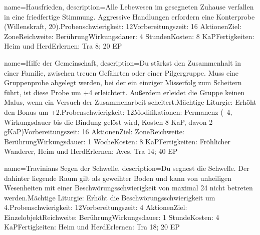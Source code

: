 {
    name={Hausfrieden},
    description={Alle Lebewesen im gesegneten Zuhause verfallen in eine friedfertige Stimmung. Aggressive Handlungen erfordern eine Konterprobe (Willenskraft, 20).\newline Probenschwierigkeit: 12\newline Vorbereitungszeit: 16 Aktionen\newline Ziel: Zone\newline Reichweite: Berührung\newline Wirkungsdauer: 4 Stunden\newline Kosten: 8 KaP\newline Fertigkeiten: Heim und Herd\newline Erlernen: Tra 8; 20 EP}
}


{
    name={Hilfe der Gemeinschaft},
    description={Du stärkst den Zusammenhalt in einer Familie, zwischen treuen Gefährten oder einer Pilgergruppe. Muss eine Gruppenprobe abgelegt werden, bei der ein einziger Misserfolg zum Scheitern führt, ist diese Probe um +4 erleichtert. Außerdem erleidet die Gruppe keinen Malus, wenn ein Versuch der Zusammenarbeit scheitert.\newline Mächtige Liturgie: Erhöht den Bonus um +2.\newline Probenschwierigkeit: 12\newline Modifikationen: Permanenz (–4, Wirkungsdauer bis die Bindung gelöst wird, Kosten 8 KaP, davon 2 gKaP)\newline Vorbereitungszeit: 16 Aktionen\newline Ziel: Zone\newline Reichweite: Berührung\newline Wirkungsdauer: 1 Woche\newline Kosten: 8 KaP\newline Fertigkeiten: Fröhlicher Wanderer, Heim und Herd\newline Erlernen: Aves, Tra 14; 40 EP}
}


{
    name={Travinians Segen der Schwelle},
    description={Du segnest die Schwelle. Der dahinter liegende Raum gilt als geweihter Boden und kann von unheiligen Wesenheiten mit einer Beschwörungsschwierigkeit von maximal 24 nicht betreten werden.\newline Mächtige Liturgie: Erhöht die Beschwörungsschwierigkeit um 4.\newline Probenschwierigkeit: 12\newline Vorbereitungszeit: 4 Aktionen\newline Ziel: Einzelobjekt\newline Reichweite: Berührung\newline Wirkungsdauer: 1 Stunde\newline Kosten: 4 KaP\newline Fertigkeiten: Heim und Herd\newline Erlernen: Tra 18; 20 EP}
}


